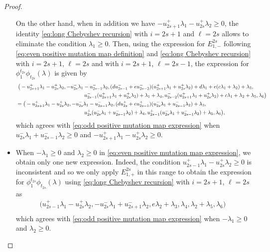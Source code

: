 \documentclass{amsart}
\numberwithin{theorem}{section}
\begin{document}
\begin{proof}
\begin{itemize}
        On the other hand, when in addition we have $-u_{2s+1}^+\lambda_1-u_{2s}^+\lambda_2 \ge 0$, the identity \eqref{eq:long Chebyshev recursion} with $i=2s+1$ and $\ell=2s$ allows to eliminate the condition $\lambda_1 \ge 0$.
        Then, using the expression for $E^{2s}_{1,-}$ following \eqref{eq:even positive mutation map definition} and \eqref{eq:long Chebyshev recursion} with $i=2s+1$, $\ell=2s$ and with $i=2s+1$, $\ell=2s-1$, the expression for $\phi^{t_{2s}}_1\phi_{t_{2s}}(\lambda)$ is given by
        \begin{align*}
          &~\big(-u_{2s+1}^+\lambda_1-u_{2s}^+\lambda_2,-u_{2s}^-\lambda_1-u_{2s-1}^-\lambda_2,(du_{2s-1}^-+eu_{2s-2}^-)(u_{2s+1}^+\lambda_1+u_{2s}^+\lambda_2)+d\lambda_1+e(c\lambda_1+\lambda_2)+\lambda_3,\\
          &\hspace{1.79in} u_{2s-1}^-(u_{2s+1}^+\lambda_1+u_{2s}^+\lambda_2)+\lambda_1+\lambda_4,u_{2s-2}^-(u_{2s+1}^+\lambda_1+u_{2s}^+\lambda_2)+c\lambda_1+\lambda_2+\lambda_5,\lambda_6\big)\\
          &=\big(-u_{2s+1}^+\lambda_1-u_{2s}^+\lambda_2,-u_{2s}^-\lambda_1-u_{2s-1}^-\lambda_2,(du_{2s}^+ + eu_{2s-1}^+)(u_{2s}^-\lambda_1+u_{2s-1}^-\lambda_2)+\lambda_3,\\
          &\hspace{1.79in} u_{2s}^+(u_{2s}^-\lambda_1+u_{2s-1}^-\lambda_2)+\lambda_4,u_{2s-1}^+(u_{2s}^-\lambda_1+u_{2s-1}^-\lambda_2)+\lambda_5,\lambda_6\big),
        \end{align*}
        which agrees with \eqref{eq:odd positive mutation map expression} when $u_{2s}^-\lambda_1+u_{2s-1}^-\lambda_2 \ge 0$ and $-u_{2s+1}^+\lambda_1-u_{2s}^+\lambda_2 \ge 0$.

      \item When $-\lambda_1 \ge 0$ and $\lambda_2 \ge 0$ in \eqref{eq:even positive mutation map expression}, we obtain only one new expression.
        Indeed, the condition $u_{2s-1}^+\lambda_1-u_{2s}^+\lambda_2 \ge 0$ is inconsistent and so we only apply $E^{2s}_{1,+}$ in this range to obtain the expression for $\phi^{t_{2s}}_1\phi_{t_{2s}}(\lambda)$ using \eqref{eq:long Chebyshev recursion} with $i=2s+1$, $\ell=2s$ as
        \begin{align*}
          \big(u_{2s-1}^+\lambda_1-u_{2s}^+\lambda_2,-u_{2s}^-\lambda_1+u_{2s+1}^-\lambda_2,e\lambda_2+\lambda_3,\lambda_4,\lambda_2+\lambda_5,\lambda_6\big) & \\
        \end{align*}
        which agrees with \eqref{eq:odd positive mutation map expression} when $-\lambda_1 \ge 0$ and $\lambda_2 \ge 0$.


\end{itemize}
\end{proof}
\end{document}
